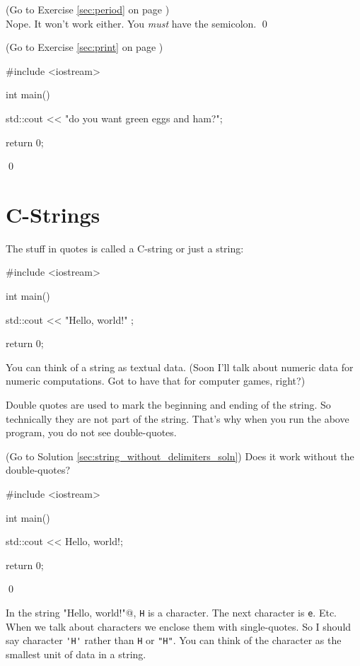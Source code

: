\begin{console}[commandchars=\~\!\@]
\begin{soln}
\label{sec:period_soln} 
(Go to Exercise \ref{sec:period} 
on page \pageref{sec:period})
\\
Nope. It won't work either. 
You \textit{must} have the semicolon.
\qed
\end{soln}


\begin{soln}
\label{sec:print_soln} 
(Go to Exercise \ref{sec:print} 
on page \pageref{sec:print})
\begin{console}
#include <iostream>

int main()
{
    std::cout << "do you want green eggs and ham?\n";

    return 0;
}
\end{console}
\qed
\end{soln}





\newpage\section{C-Strings}

The stuff in quotes is called a C-string or just a string:
\begin{console}
#include <iostream>

int main()
{
    std::cout << "Hello, world!\n" ;

    return 0;
}
\end{console}

You can think of a string as textual data. 
(Soon I'll talk about numeric data for numeric computations. 
Got to have that for computer games, right?)

Double quotes are used to mark the beginning and ending of the string. 
So technically they are not part of the string. 
That's why when you run the above program, you do not see double-quotes.


\begin{ex} \label{sec:string_without_delimiters}
(Go to Solution \ref{sec:string_without_delimiters_soln})
Does it work without the double-quotes?
\begin{console}
#include <iostream>

int main()
{
    std::cout << Hello, world!\n;

    return 0;
}
\end{console}
\qed
\end{ex}

In the string 
\verb@"Hello, world!\n"@, 
\verb!H! is a character. 
The next character is \verb!e!. Etc. 
When we talk about characters we enclose them with single-quotes. 
So I should say character \verb!'H'! rather than 
\verb!H! or \verb!"H"!. 
You can think of the character as the smallest unit of data in a string. 


\end{console}
